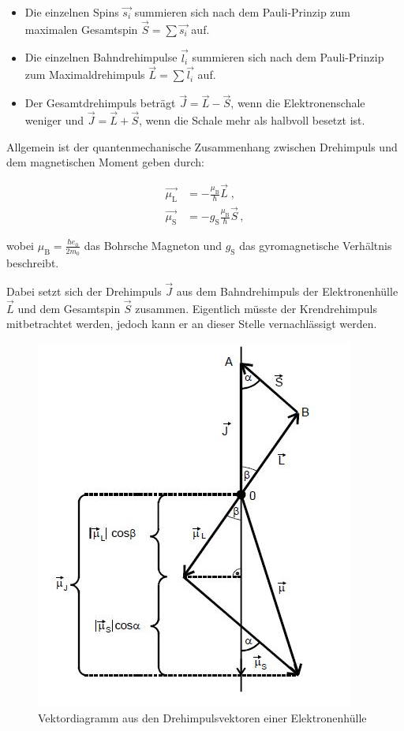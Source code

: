 \begin{itemize}
    \item Die einzelnen Spins $\vec{s_i}$ summieren sich nach dem Pauli-Prinzip zum maximalen Gesamtspin
    $\vec{S} = \sum \vec{s_i}$ auf.
    \item Die einzelnen Bahndrehimpulse $\vec{l_i}$ summieren sich nach dem Pauli-Prinzip zum Maximaldrehimpuls 
    $\vec{L} = \sum \vec{l_i}$ auf.
    \item Der Gesamtdrehimpuls beträgt $\vec{J} = \vec{L} - \vec{S}$, wenn die Elektronenschale weniger und
    $\vec{J} = \vec{L} + \vec{S}$, wenn die Schale mehr als halbvoll besetzt ist.
\end{itemize}

\noindent
Allgemein ist der quantenmechanische Zusammenhang zwischen Drehimpuls und dem magnetischen Moment geben durch:

\begin{align}
        \vec{\mu_\text{L}} &= - \frac{\mu_\text{B}}{\hbar} \vec{L} \; , \\
        \vec{\mu_\text{S}} &= - g_\text{S} \frac{\mu_\text{B}}{\hbar} \vec{S} \, ,
\end{align}

\noindent
wobei $\mu_\text{B}=\frac{\hbar e_0}{2m_0} $ das Bohrsche Magneton und $g_\text{S}$ das gyromagnetische Verhältnis beschreibt.

Dabei setzt sich der Drehimpuls $\vec{J}$ aus dem Bahndrehimpuls der Elektronenhülle $\vec{L}$ und dem Gesamtspin $\vec{S}$ zusammen. Eigentlich müsste der Krendrehimpuls mitbetrachtet
werden, jedoch kann er an dieser Stelle vernachlässigt werden.

\begin{figure} [H]
        \centering
        \includegraphics[scale=0.75]{Bilder/Vek.JPG}
        \caption{Vektordiagramm aus den Drehimpulsvektoren einer Elektronenhülle \cite{V606}}
        \label{fig:plot3}
\end{figure}

